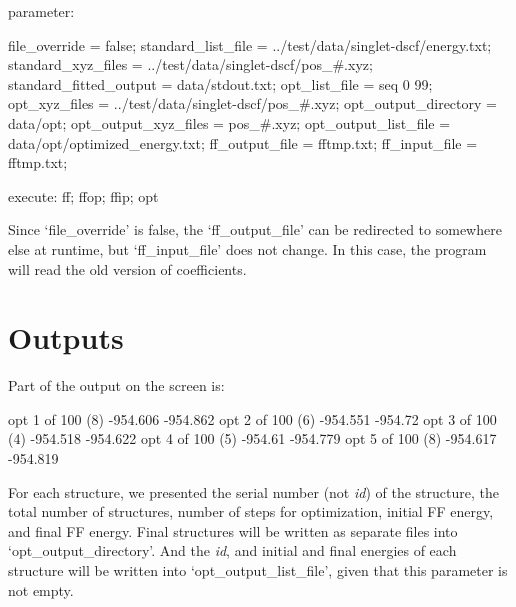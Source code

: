 \documentclass[11pt]{book}
\begin{document}
\begin{everbatim}

{ parameter: 
   
   file_override          = false;
   standard_list_file     = ../test/data/singlet-dscf/energy.txt;
   standard_xyz_files     = ../test/data/singlet-dscf/pos_#.xyz;
   standard_fitted_output = data/stdout.txt;
   opt_list_file          = seq 0 99;
   opt_xyz_files          = ../test/data/singlet-dscf/pos_#.xyz;
   opt_output_directory   = data/opt;
   opt_output_xyz_files   = pos_#.xyz;
   opt_output_list_file   = data/opt/optimized_energy.txt;
   ff_output_file         = fftmp.txt;
   ff_input_file          = fftmp.txt;

}
{ execute: ff; ffop; ffip; opt }

\end{everbatim}

Since `file\_override' is false, the `ff\_output\_file' can be redirected to somewhere else at runtime, but 
`ff\_input\_file' does not change. In this case, the program will read the old version of coefficients.

\section{Outputs}

Part of the output on the screen is:

\begin{everbatim}
opt 1 of 100 (8) -954.606 -954.862
opt 2 of 100 (6) -954.551 -954.72
opt 3 of 100 (4) -954.518 -954.622
opt 4 of 100 (5) -954.61 -954.779
opt 5 of 100 (8) -954.617 -954.819
\end{everbatim}

For each structure, we presented the serial number (not \emph{id}) of the structure, the total number of 
structures, number of steps for optimization, initial FF energy, and final FF energy. Final structures will 
be written as separate files into `opt\_output\_directory'. And the \emph{id}, and initial and final energies 
of each structure will be written into `opt\_output\_list\_file', given that this parameter is not empty.
\end{document}
